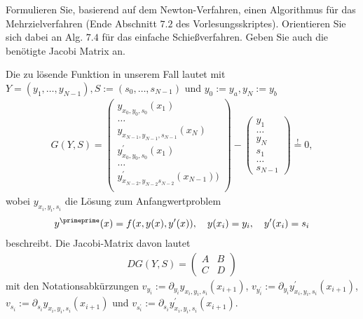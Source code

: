 \begin{exercise}
  Formulieren Sie, basierend auf dem Newton-Verfahren, einen Algorithmus für das
  Mehrzielverfahren (Ende Abschnitt $7.2$ des Vorlesungsskriptes). Orientieren
  Sie sich dabei an Alg. $7.4$ für das einfache Schießverfahren. Geben Sie auch
  die benötigte Jacobi Matrix an.
\end{exercise}

\begin{solution}
  Die zu lösende Funktion in unserem Fall lautet mit $Y = (y_1,\dots,y_{N-1}),
  S := (s_0,\dots,s_{N-1})$ und $y_0 := y_a, y_N := y_b$
  \begin{align*}
    G(Y,S) = \begin{pmatrix}
    y_{x_0,y_0,s_0}(x_1) \\
    \dots \\
    y_{x_{N-1},y_{N-1},s_{N-1}}(x_N) \\
    y^{\prime}_{x_0,y_0,s_0}(x_1) \\
    \dots \\
    y^{\prime}_{x_{N-2},y_{N-2}s_{N-2}}(x_{N-1})) \\
    \end{pmatrix}
    - \begin{pmatrix}
      y_1 \\ \dots \\ y_N \\ s_1 \\ \dots \\ s_{N-1}
  \end{pmatrix}
    \stackrel{!}{=} 0,
  \end{align*}
  wobei $y_{x_i,y_i,s_i}$ die Lösung zum Anfangwertproblem
  \begin{align*}
    y^{\primeprime}(x) = f(x,y(x),y^{\prime}(x)), \quad y(x_i) = y_i, \quad y^{\prime}(x_i) = s_i
  \end{align*}
  beschreibt.
  Die Jacobi-Matrix davon lautet
  \begin{align*}
    DG(Y,S) = \begin{pmatrix}
      A & B \\ C & D
  \end{pmatrix}
  \end{align*}
  mit den Notationsabkürzungen
  $v_{y_i} := \partial_{y_i}y_{x_i,y_i,s_i}(x_{i+1})$,
  $v_{y^{\prime}_i} := \partial_{y_i}y^{\prime}_{x_i,y_i,s_i}(x_{i+1})$,
  $v_{s_i} := \partial_{s_i}y_{x_i,y_i,s_i}(x_{i+1})$ und
  $v_{s^{\prime}_i} := \partial_{s_i}y^{\prime}_{x_i,y_i,s_i}(x_{i+1})$.
  \begin{align*}

\end{align*}
\end{solution}
